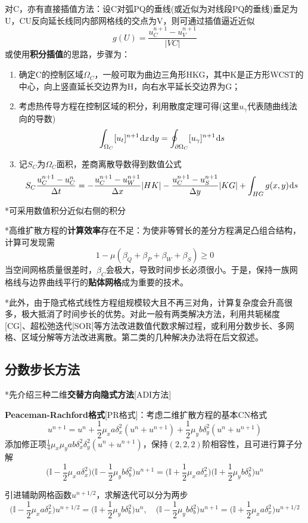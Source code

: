 \documentclass[a4paper,UTF8,fontset=windows]{ctexart}
\newcommand*{\dr}{\hspace{0.07em}\mathrm{d}}
\begin{document}
对C，亦有直接插值方法：设C对弧PQ的垂线(或近似为对线段PQ的垂线)垂足为U，CU反向延长线同内部网格线的交点为V，则可通过插值逼近近似
$$g(U)=\frac{u_C^{n+1}-u_V^{n+1}}{|VC|}$$
或使用\textbf{积分插值}的思路，步骤为：
\begin{enumerate}
    \item 确定C的控制区域$\Omega_C$，一般可取为曲边三角形HKG，其中K是正方形WCST的中心，向上竖直延长交边界为H，向右水平延长交边界为G；
    \item 考虑热传导方程在控制区域的积分，利用散度定理可得(这里$u_\gamma$代表随曲线法向的导数)
    $$\int_{\Omega_C}[u_t]^{n+1}\dr x\dr y=\oint_{\partial\Omega_C}[u_\gamma]^{n+1}\dr s$$
    \item 记$S_C$为$\Omega_C$面积，差商离散导数得到数值公式
    $$S_C\frac{u_C^{n+1}-u_C^n}{\Delta t}=-\frac{u_C^{n+1}-u_W^{n+1}}{\Delta x}|HK|-\frac{u_C^{n+1}-u_S^{n+1}}{\Delta y}|KG|+\int_{HG}g(x,y)\dr s$$   
\end{enumerate}

*可采用数值积分近似右侧的积分

*高维扩散方程的\textbf{计算效率}存在不足：为使非等臂长的差分方程满足凸组合结构，计算可发现需
$$1-\mu(\beta_Q+\beta_P+\beta_W+\beta_S)\ge0$$
当空间网格质量很差时，$\beta_C$会极大，导致时间步长必须很小。于是，保持一族网格线与边界曲线平行的\textbf{贴体网格}成为重要的技术。

*此外，由于隐式格式线性方程组规模较大且不再三对角，计算复杂度会升高很多，极大抵消了时间步长的优势。对此一般有两类解决方法，利用共轭梯度[CG]、超松弛迭代[SOR]等方法改进数值代数求解过程，或利用分数步长、多网格、区域分解等方法改进离散。第二类的几种解决办法将在后文叙述。

\subsection{分数步长方法}
*先介绍三种二维\textbf{交替方向隐式方法}[ADI方法]

\textbf{Peaceman-Rachford格式}[PR格式]：考虑二维扩散方程的基本CN格式
$$u^{n+1}=u^n+\frac{1}{2}\mu_xa\delta_x^2(u^n+u^{n+1})+\frac{1}{2}\mu_yb\delta_y^2(u^n+u^{n+1})$$
添加修正项$\frac{1}{4}\mu_x\mu_y ab\delta_x^2\delta_y^2(u^n+u^{n+1})$，保持$(2,2,2)$阶相容性，且可进行算子分解
$$\bigg(\mathbb{I}-\frac{1}{2}\mu_xa\delta_x^2\bigg)\bigg(\mathbb{I}-\frac{1}{2}\mu_yb\delta_b^2\bigg)u^{n+1}=\bigg(\mathbb{I}+\frac{1}{2}\mu_xa\delta_x^2\bigg)\bigg(\mathbb{I}+\frac{1}{2}\mu_yb\delta_b^2\bigg)u^n$$

引进辅助网格函数$u^{n+1/2}$，求解迭代可以分为两步
$$\bigg(\mathbb{I}-\frac{1}{2}\mu_xa\delta_x^2\bigg)u^{n+1/2}=\bigg(\mathbb{I}+\frac{1}{2}\mu_yb\delta_b^2\bigg)u^n,\quad\bigg(\mathbb{I}-\frac{1}{2}\mu_yb\delta_b^2\bigg)u^{n+1}=\bigg(\mathbb{I}+\frac{1}{2}\mu_xa\delta_x^2\bigg)u^{n+1/2}$$
\end{document}
